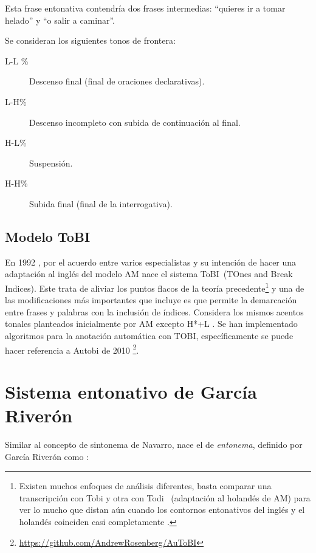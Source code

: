 Esta frase entonativa contendría dos frases intermedias: “quieres ir a tomar helado” y “o salir a caminar”.



Se consideran los siguientes tonos de frontera:

\begin{description}
\item[L-L \%] Descenso final (final de oraciones declarativas).
\item[L-H\%] Descenso incompleto con subida de continuaci\'on al final.
\item[H-L\%] Suspensi\'on.
\item[H-H\%] Subida final (final de la interrogativa).
\end{description}

\subsection{Modelo ToBI}   \label{tobi}
En 1992 \cite{silverman1992tobi}, por el acuerdo entre varios especialistas y su intenci\'on de hacer una adaptaci\'on al ingl\'es del modelo AM nace el sistema ToBI~(TOnes and Break Indices). Este trata de aliviar los puntos flacos de la teor\'ia precedente\footnote{Existen muchos enfoques de an\'alisis diferentes, basta comparar una transcripci\'on con Tobi y otra con Todi ~(adaptaci\'on al holand\'es de AM) para ver lo mucho que distan a\'un cuando los contornos entonativos del ingl\'es y el holand\'es coinciden casi completamente \cite[p.23]{hualde2003modelo}.} y una de las modificaciones m\'as importantes que incluye es que permite la demarcaci\'on entre frases y palabras con la inclusi\'on de \'indices. Considera los mismos acentos tonales planteados inicialmente por AM excepto H*+L \cite{silverman1992tobi}. Se han implementado algoritmos para la anotaci\'on autom\'atica con TOBI, espec\'ificamente se puede hacer referencia a Autobi de 2010 \cite{rosenberg2010autobi}\footnote{\url{https://github.com/AndrewRosenberg/AuToBI}}.


\section{Sistema entonativo de Garc\'ia River\'on}
Similar al concepto de sintonema de Navarro, nace el de \emph{entonema}, definido por Garc\'ia River\'on como \cite{raquel2018interrogativa}:


